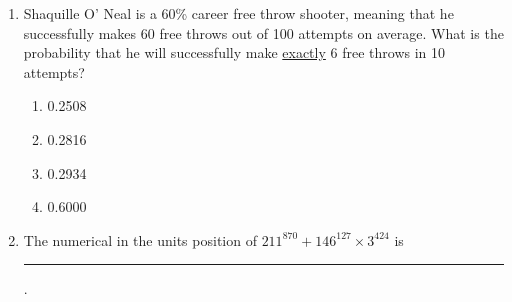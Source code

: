 \documentclass[journal]{IEEEtran}
\begin{document}
\begin{enumerate}
\item Shaquille O' Neal is a 60\% career free throw shooter, meaning that he successfully makes 60 free throws out of 100 attempts on average. What is the probability that he will successfully make \underline{exactly} 6 free throws in 10 attempts? 
\begin{multicols}{2}
    \begin{enumerate}
        \item 0.2508
        \item 0.2816
        \item 0.2934
        \item 0.6000
    \end{enumerate}
\end{multicols}

\item The numerical in the units position of $211^{870} + 146^{127} \times 3^{424}$ is \rule{1cm}{0.15mm} .
\end{enumerate}
\end{document}
